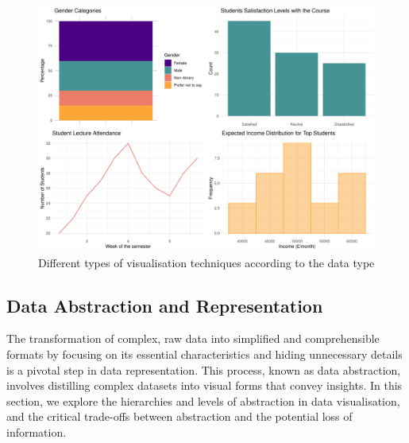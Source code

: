 \documentclass{article}\usepackage[]{graphicx}\usepackage[]{xcolor}
\makeatletter
\def\maxwidth{ %
  \ifdim\Gin@nat@width>\linewidth
    \linewidth
  \else
    \Gin@nat@width
  \fi
}
\newenvironment{knitrout}{}{} %
\numberwithin{equation}{section}
\makeatother
\begin{document}
\begin{knitrout}\scriptsize
{}\color{fgcolor}\begin{figure}[H]

{\centering \includegraphics[width=\maxwidth]{figure/beamer-data-plots-1} 

}

\caption[Different types of visualisation techniques according to the data type]{Different types of visualisation techniques according to the data type}\label{fig:data-plots}
\end{figure}

\end{knitrout}

\subsection{Data Abstraction and Representation}
The transformation of complex, raw data into simplified and comprehensible formats by focusing on its essential characteristics and hiding unnecessary details is a pivotal step in data representation. This process, known as data abstraction, involves distilling complex datasets into visual forms that convey insights. In this section, we explore the hierarchies and levels of abstraction in data visualisation, and the critical trade-offs between abstraction and the potential loss of information.\\
\end{document}
